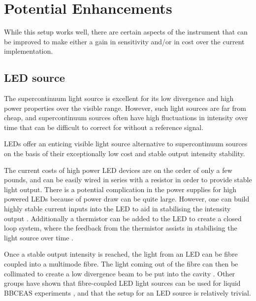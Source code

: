 \section{Potential Enhancements}\label{sec:bbceas_enhance}

While this setup works well, there are certain aspects of the instrument that
can be improved to make either a gain in sensitivity and/or in cost over the
current implementation.

\subsection{LED source}\label{sec:bbceas_led}


The supercontinuum light source is excellent for its low divergence and high
power properties over the visible range. However, such light sources are far
from cheap, and supercontinuum sources often have high fluctuations in
intensity over time that can be difficult to correct for without a reference
signal.

\acp{LED} offer an enticing visible light source alternative to supercontinuum
sources on the basis of their exceptionally low cost and stable output
intensity stability.

The current costs of high power \ac{LED} devices are on the order of only a few
pounds, and can be easily wired in series with a resistor in order to provide
stable light output. There is a potential complication in the power supplies
for high powered \acp{LED} because of power draw can be quite large.  However,
one can build highly stable current inputs into the \ac{LED} to aid in
stabilising the intensity output \cite{patent_const_current}. Additionally a
thermistor can be added to the \ac{LED} to create a closed loop system, where
the feedback from the thermistor assists in stabilising the light source over
time \cite{Wieman:2000vd}.

Once a stable output intensity is reached, the light from an \ac{LED} can be
fibre coupled into a multimode fibre. The light coming out of the fibre can
then be collimated to create a low divergence beam to be put into the cavity
\cite{Berden:2009wk}.  Other groups have shown that fibre-coupled \ac{LED}
light sources can be used for liquid \ac{BBCEAS} experiments
\cite{Islam:2007ea,Seetohul:2009du}, and that the setup for an \ac{LED} source
is relatively trivial.

